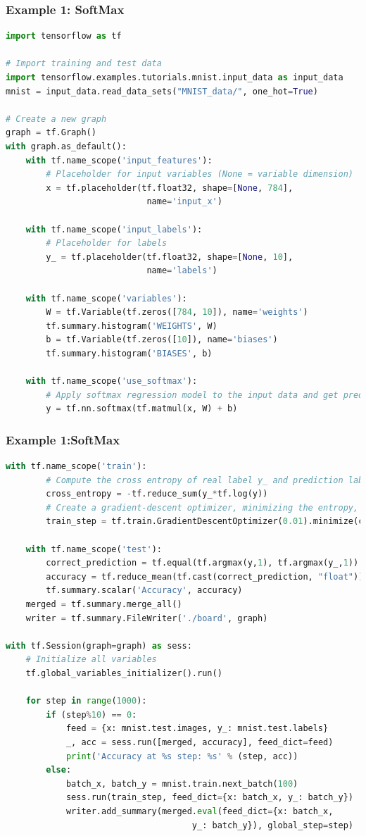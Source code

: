 \begin{frame}[fragile]
  \MyLogo
  \frametitle{Example 1: SoftMax}  
 
\scriptsize{
\begin{lstlisting}[language=python]
import tensorflow as tf

# Import training and test data
import tensorflow.examples.tutorials.mnist.input_data as input_data
mnist = input_data.read_data_sets("MNIST_data/", one_hot=True)

# Create a new graph
graph = tf.Graph()
with graph.as_default():
	with tf.name_scope('input_features'):
		# Placeholder for input variables (None = variable dimension)
		x = tf.placeholder(tf.float32, shape=[None, 784], 
							name='input_x')
							
	with tf.name_scope('input_labels'):
		# Placeholder for labels
		y_ = tf.placeholder(tf.float32, shape=[None, 10], 
							name='labels')
							
	with tf.name_scope('variables'):
		W = tf.Variable(tf.zeros([784, 10]), name='weights')
		tf.summary.histogram('WEIGHTS', W)
		b = tf.Variable(tf.zeros([10]), name='biases')
		tf.summary.histogram('BIASES', b)
			
	with tf.name_scope('use_softmax'):
		# Apply softmax regression model to the input data and get prediction labels y
		y = tf.nn.softmax(tf.matmul(x, W) + b)
\end{lstlisting}
}
\end{frame}

\begin{frame}[fragile]
  \MyLogo
  \frametitle{Example 1:SoftMax}  
\ContinueLineNumber
\scriptsize{
\begin{lstlisting}[language=python]
	with tf.name_scope('train'):
		# Compute the cross entropy of real label y_ and prediction labe y
		cross_entropy = -tf.reduce_sum(y_*tf.log(y))
		# Create a gradient-descent optimizer, minimizing the entropy, learning rate 0.01
		train_step = tf.train.GradientDescentOptimizer(0.01).minimize(cross_entropy)

	with tf.name_scope('test'):
		correct_prediction = tf.equal(tf.argmax(y,1), tf.argmax(y_,1))
		accuracy = tf.reduce_mean(tf.cast(correct_prediction, "float"))
		tf.summary.scalar('Accuracy', accuracy)
	merged = tf.summary.merge_all()
	writer = tf.summary.FileWriter('./board', graph)
	
with tf.Session(graph=graph) as sess:
	# Initialize all variables
	tf.global_variables_initializer().run()
	
	for step in range(1000):
		if (step%10) == 0:
			feed = {x: mnist.test.images, y_: mnist.test.labels}
			_, acc = sess.run([merged, accuracy], feed_dict=feed)
			print('Accuracy at %s step: %s' % (step, acc))
		else:
			batch_x, batch_y = mnist.train.next_batch(100)
			sess.run(train_step, feed_dict={x: batch_x, y_: batch_y})
			writer.add_summary(merged.eval(feed_dict={x: batch_x,
									 y_: batch_y}), global_step=step)
\end{lstlisting}
}


\end{frame}
